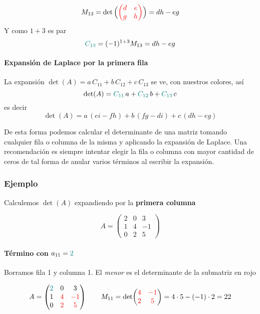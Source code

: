 \documentclass{article}
\begin{document}
\[
M_{13}=\det\Big({\color{red}\begin{pmatrix} d & e\\ g & h \end{pmatrix}}\Big)=dh-eg
\]
Y como \(1+3\) es par
\[
{\color{teal}{C_{13}}}=(-1)^{1+3}M_{13}=dh-eg
\]

\paragraph*{Expansión de Laplace por la primera fila} 
La expansión \(\det(A)=a\,C_{11}+b\,C_{12}+c\,C_{13}\) se ve, con nuestros colores, así
\[
\det(A)={\color{teal}{C_{11}}}\,{\color{black}{a}}+{\color{teal}{C_{12}}}\,{\color{black}{b}}+{\color{teal}{C_{13}}}\,{\color{black}{c}}
\]
es decir
\[
\det(A)=a\,(ei-fh)+b\,(fg-di)+c\,(dh-eg)
\]

De esta forma podemos calcular el determinante de una matriz tomando cualquier fila o columna de la misma y aplicando la expansión de Laplace. Una recomendación es siempre intentar elegir la fila o columna con mayor cantidad de ceros de tal forma de anular varios términos al escribir la expansión.




\subsubsection*{Ejemplo}

Calculemos \(\det(A)\) expandiendo por la \textbf{primera columna}

\[
A=
\begin{pmatrix}
2 & 0 & 3\\
1 & 4 & -1\\
0 & 2 & 5
\end{pmatrix}
\]

\paragraph*{Término con \(a_{11}={\color{teal}2}\)}
Borramos fila 1 y columna 1. El \emph{menor} es el determinante de la submatriz en {\color{red}rojo}

\[
A=
\begin{pmatrix}
{\color{teal}2} & 0 & 3\\
1 & {\color{red}4} & {\color{red}-1}\\
0 & {\color{red}2} & {\color{red}5}
\end{pmatrix}
\qquad
M_{11}=\det\!\begin{pmatrix}{\color{red}4} & {\color{red}-1}\\ {\color{red}2} & {\color{red}5}\end{pmatrix}
=4\cdot 5-(-1)\cdot 2=22
\]
\end{document}
